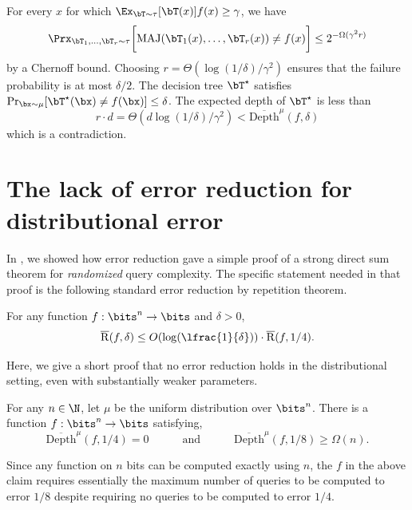 \documentclass[11pt]{article}
\begin{document}
For every $x$ for which $\Ex_{\bT\sim\tau}[\bT(x)]f(x)\ge \gamma$, we have
$$
\Prx_{\bT_1,\ldots,\bT_r\sim\tau}\bigg[\text{MAJ}(\bT_1(x),\ldots,\bT_r(x))\neq f(x)\bigg]\le 2^{-\Omega(\gamma^2 r)}
$$
by a Chernoff bound. Choosing $r=\Theta(\log(1/\delta)/\gamma^2)$ ensures that the failure probability is at most $\delta/2$. The decision tree $\bT^{\star}$ satisfies $\Pr_{\bx\sim\mu}[\bT^\star(\bx)\neq f(\bx)]\le \delta$. The expected depth of $\bT^\star$ is less than
$$
r\cdot d=\Theta(d\log (1/\delta)/\gamma^2)<\overline{\mathrm{Depth}}^\mu(f,\delta)
$$
which is a contradiction.

\section{The lack of error reduction for distributional error}
\label{sec:no-boosting}
In , we showed how error reduction gave a simple proof of a strong direct sum theorem for \emph{randomized} query complexity. The specific statement needed in that proof is the following standard error reduction by repetition theorem.
\begin{fact}
    For any function $f:\bits^n \to \bits$ and $\delta > 0$,
    \begin{equation*}
        \overline{\mathrm{R}}(f,\delta) \leq O(\log(\lfrac{1}{\delta}))\cdot \overline{\mathrm{R}}(f,1/4).
    \end{equation*}
\end{fact}
Here, we give a short proof that no error reduction holds in the distributional setting, even with substantially weaker parameters.
\begin{claim}
    \label{claim:no-boosting}
    For any $n \in \N$, let $\mu$ be the uniform distribution over $\bits^n$. There is a function $f:\bits^n \to \bits$ satisfying,
    \begin{equation*}
        \overline{\mathrm{Depth}}^{\mu}(f,1/4) = 0 \quad\quad\quad\text{and}\quad\quad\quad \overline{\mathrm{Depth}}^{\mu}(f,1/8) \geq \Omega(n).
    \end{equation*}
\end{claim}
Since any function on $n$ bits can be computed exactly using $n$, the $f$ in the above claim requires essentially the maximum number of queries to be computed to error $1/8$ despite requiring no queries to be computed to error $1/4$.
\end{document}
